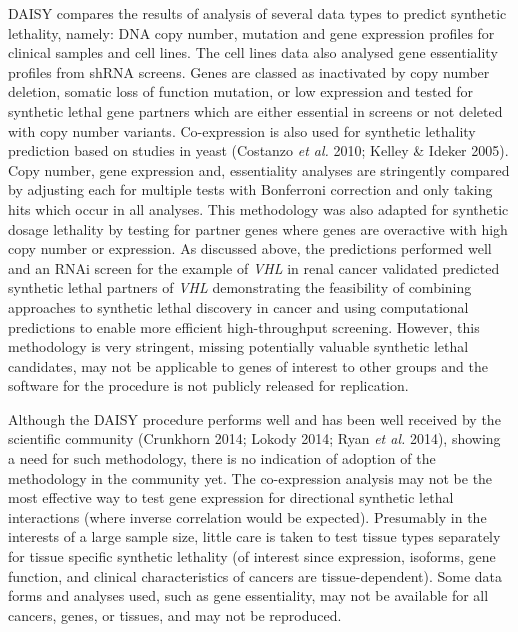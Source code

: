 DAISY compares the results of analysis of several data types to predict synthetic lethality, namely: DNA copy number, mutation and gene expression profiles for clinical samples and cell lines. The cell lines data also analysed gene essentiality profiles from shRNA screens. Genes are classed as inactivated by copy number deletion, somatic loss of function mutation, or low expression and tested for synthetic lethal gene partners which are either essential in screens or not deleted with copy number variants. Co-expression is also used for synthetic lethality prediction based on studies in yeast (Costanzo\textit{ et al.} 2010; Kelley \& Ideker 2005). Copy number, gene expression and, essentiality analyses are stringently compared by adjusting each for multiple tests with Bonferroni correction and only taking hits which occur in all analyses. This methodology was also adapted for synthetic dosage lethality by testing for partner genes where genes are overactive with high copy number or expression. As discussed above, the predictions performed well and an RNAi screen for the example of \textit{VHL} in renal cancer validated predicted synthetic lethal partners of \textit{VHL} demonstrating the feasibility of combining approaches to synthetic lethal discovery in cancer and using computational predictions to enable more efficient high-throughput screening. However, this methodology is very stringent, missing potentially valuable synthetic lethal candidates, may not be applicable to genes of interest to other groups and the software for the procedure is not publicly released for replication.  

Although the DAISY procedure performs well and has been well received by the scientific community (Crunkhorn 2014; Lokody 2014; Ryan\textit{ et al.} 2014), showing a need for such methodology, there is no indication of adoption of the methodology in the community yet. The co-expression analysis may not be the most effective way to test gene expression for directional synthetic lethal interactions (where inverse correlation would be expected). Presumably in the interests of a large sample size, little care is taken to test tissue types separately for tissue specific synthetic lethality (of interest since expression, isoforms, gene function, and clinical characteristics of cancers are tissue-dependent). Some data forms and analyses used, such as gene essentiality, may not be available for all cancers, genes, or tissues, and may not be reproduced.  

